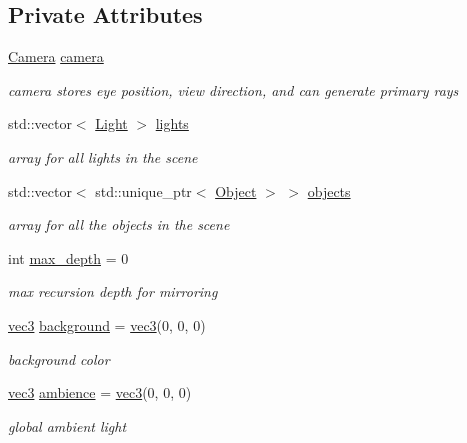 \subsection*{Private Attributes}
\begin{DoxyCompactItemize}
\item 
\hyperlink{classCamera}{Camera} \hyperlink{classScene_afed13ec4ba2d7ab75b273d507911b498}{camera}
\begin{DoxyCompactList}\small\item\em camera stores eye position, view direction, and can generate primary rays \end{DoxyCompactList}\item 
std\+::vector$<$ \hyperlink{structLight}{Light} $>$ \hyperlink{classScene_ab3625e4ac3c6e47156edd23e2421e828}{lights}
\begin{DoxyCompactList}\small\item\em array for all lights in the scene \end{DoxyCompactList}\item 
std\+::vector$<$ std\+::unique\+\_\+ptr$<$ \hyperlink{structObject}{Object} $>$ $>$ \hyperlink{classScene_abbd6f5b3a4639c3b089037519085bf86}{objects}
\begin{DoxyCompactList}\small\item\em array for all the objects in the scene \end{DoxyCompactList}\item 
int \hyperlink{classScene_a9150039f4d2c46a617b51c7920142d52}{max\+\_\+depth} = 0
\begin{DoxyCompactList}\small\item\em max recursion depth for mirroring \end{DoxyCompactList}\item 
\hyperlink{classvec3}{vec3} \hyperlink{classScene_ab2f20cf753edf2f92fec9b1ad7c9b93e}{background} = \hyperlink{classvec3}{vec3}(0, 0, 0)
\begin{DoxyCompactList}\small\item\em background color \end{DoxyCompactList}\item 
\hyperlink{classvec3}{vec3} \hyperlink{classScene_a8809b5fcac40d60ab499e90f8ae592b3}{ambience} = \hyperlink{classvec3}{vec3}(0, 0, 0)
\begin{DoxyCompactList}\small\item\em global ambient light \end{DoxyCompactList}\end{DoxyCompactItemize}


